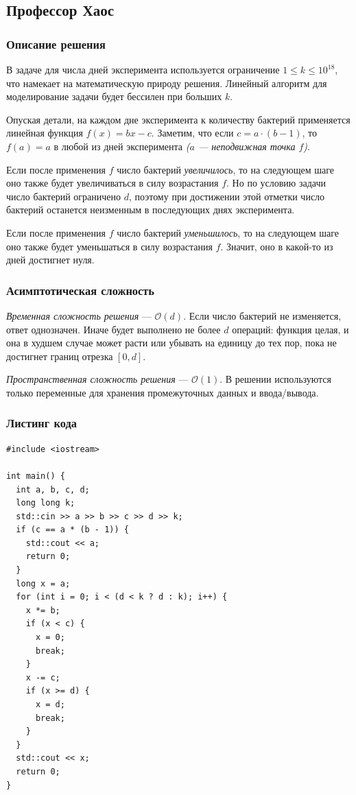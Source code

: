 \subsection{Профессор Хаос}

\subsubsection{Описание решения}

В задаче для числа дней эксперимента используется ограничение \( 1\leq k\leq 10^{18} \), что намекает на математическую природу решения. Линейный алгоритм для моделирование задачи будет бессилен при больших \( k \).

Опуская детали, на каждом дне эксперимента к количеству бактерий применяется линейная функция \( f(x)=bx-c \). Заметим, что если \( c=a\cdot(b-1) \), то \( f(a)=a \) в любой из дней эксперимента \textit{(\( a \) --- неподвижная точка \( f \))}.

Если после применения \( f \) число бактерий \textit{увеличилось}, то на следующем шаге оно также будет увеличиваться в силу возрастания \( f \). Но по условию задачи число бактерий ограничено \( d \), поэтому при достижении этой отметки число бактерий останется неизменным в последующих днях эксперимента.

Если после применения \( f \) число бактерий \textit{уменьшилось}, то на следующем шаге оно также будет уменьшаться в силу возрастания \( f \). Значит, оно в какой-то из дней достигнет нуля.

\subsubsection{Асимптотическая сложность}

\textit{Временная сложность решения} --- \( \mathcal{O}(d) \). Если число бактерий не изменяется, ответ однозначен. Иначе будет выполнено не более \( d \) операций: функция целая, и она в худшем случае может расти или убывать на единицу до тех пор, пока не достигнет границ отрезка \( [0,d] \).

\textit{Пространственная сложность решения} --- \( \mathcal{O}(1) \). В решении используются только переменные для хранения промежуточных данных и ввода/вывода.

\subsubsection{Листинг кода}

\begin{lstlisting}
#include <iostream>

int main() {
  int a, b, c, d;
  long long k;
  std::cin >> a >> b >> c >> d >> k;
  if (c == a * (b - 1)) {
    std::cout << a;
    return 0;
  }
  long x = a;
  for (int i = 0; i < (d < k ? d : k); i++) {
    x *= b;
    if (x < c) {
      x = 0;
      break;
    }
    x -= c;
    if (x >= d) {
      x = d;
      break;
    }
  }
  std::cout << x;
  return 0;
}
\end{lstlisting}